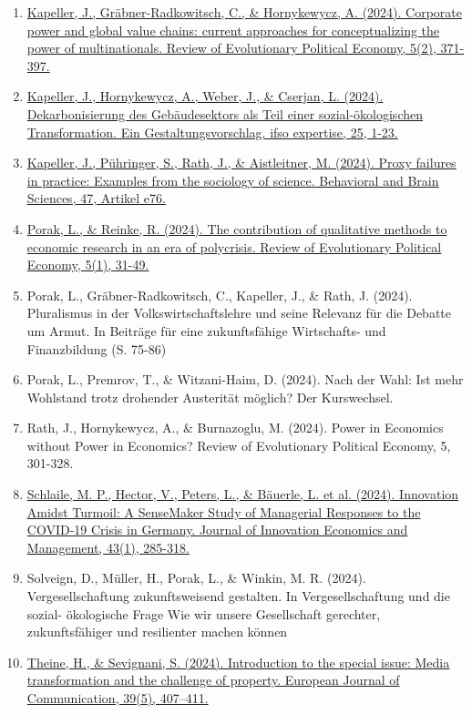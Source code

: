 \begin{enumerate}
	 \item \href{https://doi.org/10.1007/s43253-024-00121-5}{Kapeller, J., Gräbner-Radkowitsch, C., \& Hornykewycz, A. (2024). Corporate power and global value chains: current approaches for conceptualizing the power of multinationals. Review of Evolutionary Political Economy, 5(2), 371-397.}
	 \item \href{https://www.uni-due.de/imperia/md/images/soziooekonomie/ifsoexp25_khwc2024_dekarbonisierung_gebaeudesektor_v2.1.pdf}{Kapeller, J., Hornykewycz, A., Weber, J., \& Cserjan, L. (2024). Dekarbonisierung des Gebäudesektors als Teil einer sozial-ökologischen Transformation. Ein Gestaltungsvorschlag. ifso expertise, 25, 1-23.}
	 \item \href{https://doi.org/10.1017/S0140525X23002856}{Kapeller, J., Pühringer, S., Rath, J., \& Aistleitner, M. (2024). Proxy failures in practice: Examples from the sociology of science. Behavioral and Brain Sciences, 47, Artikel e76.}
	 \item \href{https://doi.org/10.1007/s43253-024-00116-2}{Porak, L., \& Reinke, R. (2024). The contribution of qualitative methods to economic research in an era of polycrisis. Review of Evolutionary Political Economy, 5(1), 31-49.}
	 \item Porak, L., Gräbner-Radkowitsch, C., Kapeller, J., \& Rath, J. (2024). Pluralismus in der Volkswirtschaftslehre und seine Relevanz für die Debatte um Armut. In Beiträge für eine zukunftsfähige Wirtschafts- und Finanzbildung (S. 75-86)
	 \item Porak, L., Premrov, T., \& Witzani-Haim, D. (2024). Nach der Wahl: Ist mehr Wohl­stand trotz dro­hen­der Aus­teri­tät möglich? Der Kurswechsel.
	 \item Rath, J., Hornykewycz, A., \& Burnazoglu, M. (2024). Power in Economics without Power in Economics? Review of Evolutionary Political Economy, 5, 301-328.
	 \item \href{https://doi.org/10.3917/jie.pr1.0154}{Schlaile, M. P., Hector, V., Peters, L., \& Bäuerle, L. et al. (2024). Innovation Amidst Turmoil: A SenseMaker Study of Managerial Responses to the COVID-19 Crisis in Germany. Journal of Innovation Economics and Management, 43(1), 285-318.}
	 \item Solveign, D., Müller, H., Porak, L., \& Winkin, M. R. (2024). Vergesellschaftung zukunftsweisend gestalten. In Vergesellschaftung und die sozial- ökologische Frage Wie wir unsere Gesellschaft gerechter, zukunftsfähiger und resilienter machen können
	 \item \href{https://doi.org/10.1177/02673231241274347}{Theine, H., \& Sevignani, S. (2024). Introduction to the special issue: Media transformation and the challenge of property. European Journal of Communication, 39(5), 407–411.}

\end{enumerate}
